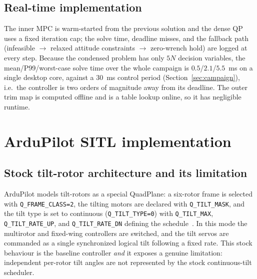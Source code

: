 \documentclass[preprint,3p,11pt]{elsarticle}
\begin{document}
\subsection{Real-time implementation}\label{sec:realtime}
The inner MPC is warm-started from the previous solution and the dense QP
uses a fixed iteration cap; the solve time, deadline misses, and the fallback
path (infeasible $\rightarrow$ relaxed attitude constraints $\rightarrow$
zero-wrench hold) are logged at every step. Because the condensed problem has
only $5N$ decision variables, the mean/P99/worst-case solve time over the
whole campaign is $0.5$/$2.1$/$5.5$~ms on a single desktop core, against a
$30$~ms control period (Section~\ref{sec:campaign}), i.e.\ the controller is
two orders of magnitude away from its deadline. The outer trim map is
computed offline and is a table lookup online, so it has negligible runtime.

\section{ArduPilot SITL implementation}\label{sec:sitl}

\subsection{Stock tilt-rotor architecture and its limitation}\label{sec:stock}
ArduPilot models tilt-rotors as a special QuadPlane: a six-rotor frame is
selected with \texttt{Q\_FRAME\_CLASS=2}, the tilting motors are declared with
\texttt{Q\_TILT\_MASK}, and the tilt type is set to continuous
(\texttt{Q\_TILT\_TYPE=0}) with \texttt{Q\_TILT\_MAX},
\texttt{Q\_TILT\_RATE\_UP}, and \texttt{Q\_TILT\_RATE\_DN} defining the
schedule~\cite{ardupilot2024tilt,ardupilot2024transitions}. In this mode the
multirotor and fixed-wing controllers are switched, and the tilt servos are
commanded as a single synchronized logical tilt following a fixed rate. This
stock behaviour is the baseline controller \emph{and} it exposes a genuine
limitation: independent per-rotor tilt angles are not represented by the
stock continuous-tilt scheduler.
\end{document}
